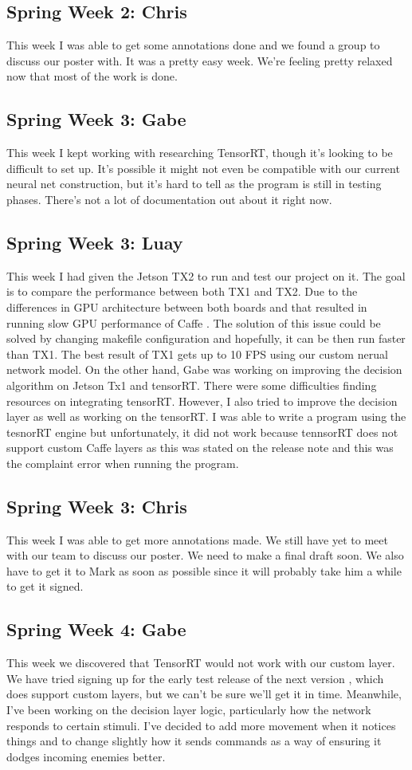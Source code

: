 \documentclass[onecolumn, draftclsnofoot,10pt, compsoc]{IEEEtran}
\begin{document}
\subsection{Spring Week 2: Chris}
This week I was able to get some annotations done and we found a group to discuss our poster with. It was a pretty easy week. We're feeling pretty relaxed now that most of the work is done.
\subsection{Spring Week 3: Gabe}
This week I kept working with researching TensorRT, though it's looking to be difficult to set up. It's possible it might not even be compatible with our current neural net construction, but it's hard to tell as the program is still in testing phases. There's not a lot of documentation out about it right now.
\subsection{Spring Week 3: Luay}
This week I had given the Jetson TX2 to run and test our project on it. The goal is to compare the performance between both TX1 and TX2. Due to the differences in GPU architecture between both boards and that resulted in running slow GPU performance of Caffe . The solution of this issue could be solved by changing makefile configuration and hopefully, it can be then run faster than TX1. The best result of TX1 gets up to 10 FPS using our custom nerual network model. On the other hand, Gabe was working on improving the decision algorithm on Jetson Tx1 and tensorRT. There were some difficulties finding resources on integrating tensorRT. However, I also tried to improve the decision layer as well as working on the tensorRT. I was able to write a program using the tesnorRT engine but unfortunately, it did not work because tennsorRT does not support custom Caffe layers as this was stated on the release note and this was the complaint error when running the program.
\subsection{Spring Week 3: Chris}
This week I was able to get more annotations made. We still have yet to meet with our team to discuss our poster. We need to make a final draft soon. We also have to get it to Mark as soon as possible since it will probably take him a while to get it signed.
\subsection{Spring Week 4: Gabe}
This week we discovered that TensorRT would not work with our custom layer. We have tried signing up for the early test release of the next version , which does support custom layers, but we can't be sure we'll get it in time. Meanwhile, I've been working on the decision layer logic, particularly how the network responds to certain stimuli. I've decided to add more movement when it notices things and to change slightly how it sends commands as a way of ensuring it dodges incoming enemies better.
\end{document}
